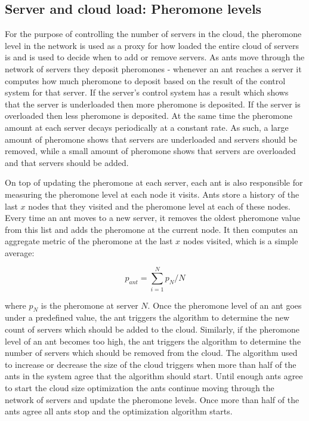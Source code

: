 \subsection{Server and cloud load: Pheromone levels}

For the purpose of controlling the number of servers in the cloud, the pheromone level in the network is used as a proxy for how loaded the entire cloud of servers is and is used to decide when to add or remove servers. As ants move through the network of servers they deposit pheromones - whenever an ant reaches a server it computes how much pheromone to deposit based on the result of the control system for that server. If the server's control system has a result which shows that the server is underloaded then more pheromone is deposited. If the server is overloaded then less pheromone is deposited. At the same time the pheromone amount at each server decays periodically at a constant rate. As such, a large amount of pheromone shows that servers are underloaded and servers should be removed, while a small amount of pheromone shows that servers are overloaded and that servers should be added.

On top of updating the pheromone at each server, each ant is also responsible for measuring the pheromone level at each node it visits. Ants store a history of the last $x$ nodes that they visited and the pheromone level at each of these nodes. Every time an ant moves to a new server, it removes the oldest pheromone value from this list and adds the pheromone at the current node. It then computes an aggregate metric of the pheromone at the last $x$ nodes visited, which is a simple average:

\begin{equation}
p_{ant} = \sum_{i=1}^{N} p_{N} / N
\end{equation}

where $p_{N}$ is the pheromone at server $N$. Once the pheromone level of an ant goes under a predefined value, the ant triggers the algorithm to determine the new count of servers which should be added to the cloud. Similarly, if the pheromone level of an ant becomes too high, the ant triggers the algorithm to determine the number of servers which should be removed from the cloud. The algorithm used to increase or decrease the size of the cloud triggers when more than half of the ants in the system agree that the algorithm should start. Until enough ants agree to start the cloud size optimization the ants continue moving through the network of servers and update the pheromone levels. Once more than half of the ants agree all ants stop and the optimization algorithm starts.

